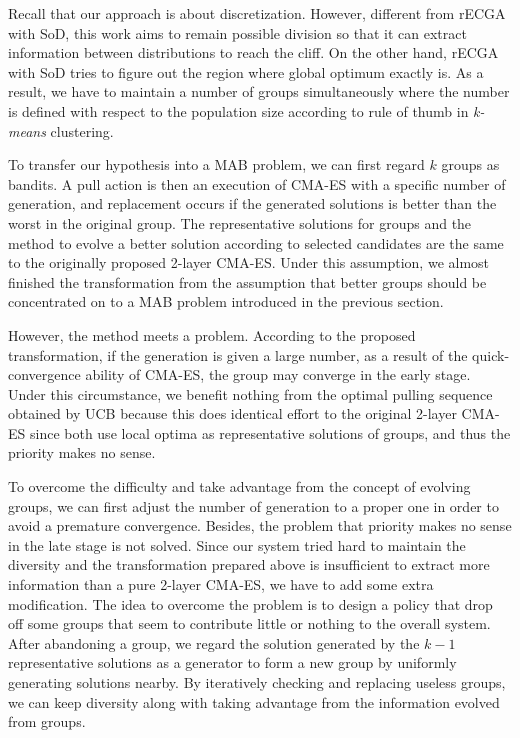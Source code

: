 Recall that our approach is about discretization.
However, different from rECGA with SoD, this work aims to remain
possible division so that it can extract information between distributions
to reach the cliff.
On the other hand, rECGA with SoD tries to figure out the region where
global optimum exactly is.
As a result, we have to maintain a number of groups simultaneously where
the number is defined with respect to the population size according to
rule of thumb in \emph{k-means} clustering.

To transfer our hypothesis into a MAB problem, we can first regard $k$
groups as bandits.
A pull action is then an execution of CMA-ES with a specific number of
generation, and replacement occurs if the generated solutions is better
than the worst in the original group.
The representative solutions for groups and the method to evolve a
better solution according to selected candidates are the same to the
originally proposed 2-layer CMA-ES.
Under this assumption, we almost finished the transformation from the
assumption that better groups should be concentrated on to a MAB problem
introduced in the previous section.

However, the method meets a problem.
According to the proposed transformation, if the generation is given a
large number, as a result of the quick-convergence ability of CMA-ES,
the group may converge in the early stage.
Under this circumstance, we benefit nothing from the optimal pulling
sequence obtained by UCB because this does identical effort to the
original 2-layer CMA-ES since both use local optima as representative
solutions of groups, and thus the priority makes no sense.  

To overcome the difficulty and take advantage from the concept of
evolving groups, we can first adjust the number of generation to a
proper one in order to avoid a premature convergence.
Besides, the problem that priority makes no sense in the late stage is
not solved.
Since our system tried hard to maintain the diversity and the
transformation prepared above is insufficient to extract more
information than a pure 2-layer CMA-ES, we have to add some extra
modification.
The idea to overcome the problem is to design a policy that drop off
some groups that seem to contribute little or nothing to the overall
system.
After abandoning a group, we regard the solution generated by the $k-1$
representative solutions as a generator to form a new group by uniformly
generating solutions nearby.
By iteratively checking and replacing useless groups, we can keep
diversity along with taking advantage from the information evolved from
groups. 

